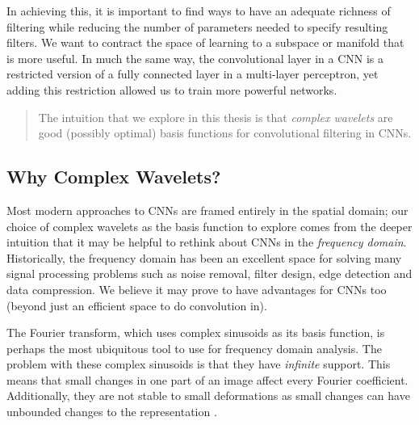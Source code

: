 In achieving this, it is important to find ways to have an adequate
richness of filtering while reducing the number of parameters needed to specify resulting
filters. We want to contract the space of learning to a subspace or manifold that 
is more useful. In much the same way, the convolutional layer in a CNN is a restricted
version of a fully connected layer in a multi-layer perceptron, yet adding this
restriction allowed us to train more powerful networks. 

\begin{quote}
The intuition that we explore in this thesis is that \emph{complex wavelets} are
good (possibly optimal) basis functions for convolutional filtering in CNNs.
\end{quote}

\subsection{Why Complex Wavelets?}
Most modern approaches to CNNs are framed entirely in the spatial domain; our
choice of complex wavelets as the basis function to explore comes from the
deeper intuition that it may be helpful to rethink about CNNs in the
\emph{frequency domain}.  Historically, the frequency domain has been an
excellent space for solving many signal processing problems such as noise
removal, filter design, edge detection and data compression. We believe it may prove to
have advantages for CNNs too (beyond just an efficient space to do convolution
in). 

The Fourier transform, which uses complex sinusoids as 
its basis function, is perhaps the most ubiquitous tool to use for frequency
domain analysis. The problem with these complex sinusoids is that they have
\emph{infinite} support. This means that small changes in one part of an image
affect every Fourier coefficient. Additionally, they are not stable to small
deformations as small changes can have unbounded changes to the representation
\cite{mallat_group_2012}. 

